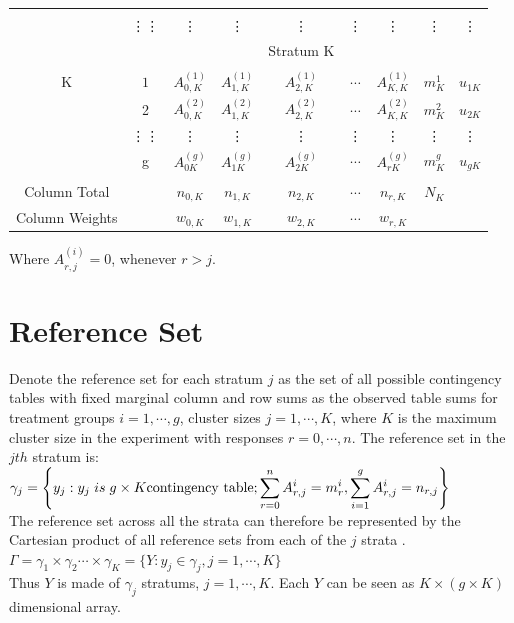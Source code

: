 \documentclass[12pt,oneside]{report}
\theoremstyle{definition}
\theoremstyle{mystyle}
\begin{document}
\begin{table}[h!]
\begin{center}
\begin{tabular}{c c|c c c c c c c}
			&&&&&&&&\\
			&\vdots\vdots&\vdots&\vdots&\vdots&\vdots&\vdots&\vdots&\vdots\\
			&&&&Stratum K&&&&\\
			&&&&&&&&\\
			K&$ 1$ & $ A_{0,K}^{(1)}$ & $ A_{1,K}^{(1)}$ & $ A_{2,K}^{(1)}$  & $\cdots$  &$A_{K,K}^{(1)}$&$m_{K}^{1}$ &$u_{1K}$\\
			&2 &$ A_{0,K}^{(2)}$ & $ A_{1,K}^{(2)}$ & $ A_{2,K}^{(2)}$  & $\cdots$  &$A_{K,K}^{(2)}$&$m_{K}^{2}$&$u_{2K}$ \\
			&\vdots\vdots&\vdots&\vdots&\vdots&\vdots&\vdots&\vdots&\vdots\\
			& g &$ A_{0K}^{(g)}$ & $ A_{1K}^{(g)}$ & $ A_{2K}^{(g)}$  & $\cdots$  &$A_{rK}^{(g)}$&$m_{K}^{g}$&$u_{gK}$ \\
			&&&&&&&&\\
			Column Total	& & $n_{0,K}$ & $n_{1,K}$ &$n_{2,K}$& $\cdots$  & $n_{r,K}$&$N_{K}$& \\ [1ex]
			Column Weights	& & $w_{0,K}$ & $w_{1,K}$ &$w_{2,K}$& $\cdots$  & $w_{r,K}$&& \\ [1ex]
			
			\hline
		\end{tabular}
		
	\end{center}
\end{table}
Where $A_{r,j}^{(i)}=0$, whenever $r>j$.

\newpage
\section{Reference Set}
Denote the reference set  for each stratum  $j$ as the set of all possible contingency tables with fixed marginal column  and row sums as the observed table sums for treatment groups $i=1,\cdots,g$, cluster sizes 
$j=1,\cdots,K$, where $K$ is the maximum cluster size in the experiment with  responses $r=0,\cdots,n$. The reference set in the $jth$ stratum is:\\

$\gamma_{j}=\displaystyle \left \{y_{j}:y_{j} \hspace{1mm}{is}\hspace{1mm} g\times K   \textrm{contingency table};\sum\limits_{r=0}^{n}A_{r,j}^{i}=m^{i}_{r},\sum\limits_{i=1}^{g}A_{r,j}^{i}=n_{r,j} \right \}$\\
The reference set across all the strata can  therefore be represented by the Cartesian product of all reference sets from each of the $j$ strata .\\
$\Gamma=\gamma_{1}\times\gamma_{2}\cdots\times\gamma_{K}=\{Y:y_{j}\in \gamma_{j},j=1,\cdots,K\}$\\
Thus $Y$ is made of $\gamma_{j}$ stratums, $j=1,\cdots,K$. Each $Y$ can be seen as $K\times (g \times K)$ dimensional array.
\end{document}
